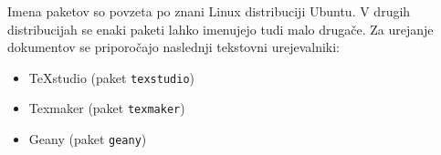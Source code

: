 Imena paketov so povzeta po znani Linux distribuciji Ubuntu. V drugih distribucijah se enaki paketi lahko imenujejo tudi malo drugače. Za urejanje dokumentov se priporočajo naslednji tekstovni urejevalniki:

\begin{itemize}[noitemsep]
	\item TeXstudio (paket \texttt{texstudio})
	\item Texmaker (paket \texttt{texmaker})
	\item Geany (paket \texttt{geany})
\end{itemize}